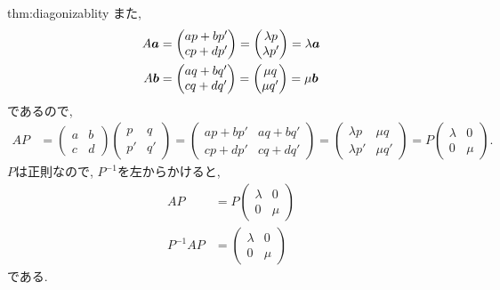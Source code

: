 \begin{proofof}{thm:diagonizablity}
  また,
  \begin{align*}
    A\boldsymbol{a}&=
        \begin{pmatrix}
      ap+bp' \\cp+dp'
    \end{pmatrix}
    =
    \begin{pmatrix}
      \lambda p\\ \lambda p'
    \end{pmatrix}
    =
    \lambda \boldsymbol{a}\\
    A\boldsymbol{b}&=
    \begin{pmatrix}
      aq+bq'\\cq+dq'
    \end{pmatrix}
    =
    \begin{pmatrix}
      \mu q\\\mu q'
    \end{pmatrix}
    =
    \mu \boldsymbol{b}
  \end{align*}
  であるので,
  \begin{align*}
    AP&=
    \begin{pmatrix}
      a &b\\c&d
    \end{pmatrix}
    \begin{pmatrix}
      p&q\\p'&q'
    \end{pmatrix}=
    \begin{pmatrix}
      ap+bp' &aq+bq'\\cp+dp'&cq+dq'
    \end{pmatrix}
    =
    \begin{pmatrix}
      \lambda p &\mu q\\\lambda p'&\mu q'
    \end{pmatrix}
    =
    P
    \begin{pmatrix}
      \lambda  &0\\0&\mu 
    \end{pmatrix}.
  \end{align*}
  $P$は正則なので, $P^{-1}$を左からかけると,
  \begin{align*}
    AP&=
    P
    \begin{pmatrix}
      \lambda  &0\\0&\mu 
    \end{pmatrix}\\
    P^{-1}AP&=
    \begin{pmatrix}
      \lambda  &0\\0&\mu 
    \end{pmatrix}
  \end{align*}
  である.
\end{proofof}

